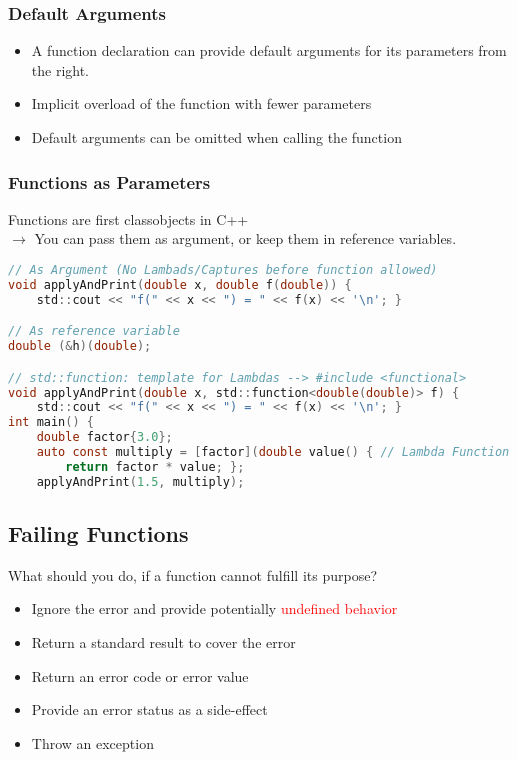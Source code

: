 \subsubsection{Default Arguments}
\begin{itemize}
    \item A function declaration can provide default arguments for its parameters from the right.
    \item Implicit overload of the function with fewer parameters
    \item Default arguments can be omitted when calling the function
\end{itemize}

\subsubsection{Functions as Parameters}
Functions are \dq first class\dq objects in C++\\
$\rightarrow$ You can pass them as argument, or keep them in reference variables.

\begin{lstlisting}[style=frame, style= linenumbers, language=C]
// As Argument (No Lambads/Captures before function allowed)
void applyAndPrint(double x, double f(double)) {
    std::cout << "f(" << x << ") = " << f(x) << '\n'; }

// As reference variable
double (&h)(double);

// std::function: template for Lambdas --> #include <functional>
void applyAndPrint(double x, std::function<double(double)> f) {
    std::cout << "f(" << x << ") = " << f(x) << '\n'; }
int main() {
    double factor{3.0};
    auto const multiply = [factor](double value() { // Lambda Function
        return factor * value; };
    applyAndPrint(1.5, multiply);
\end{lstlisting}

\subsection{Failing Functions}
What should you do, if a function cannot fulfill its purpose?
\begin{itemize}
    \item Ignore the error and provide potentially \textcolor{red}{undefined behavior}
    \item Return a standard result to cover the error
    \item Return an error code or error value
    \item Provide an error status as a side-effect
    \item Throw an exception
\end{itemize}

